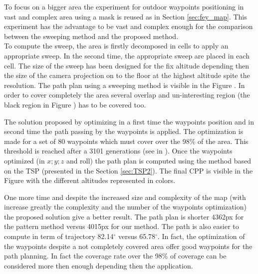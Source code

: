 To focus on a bigger area the experiment for outdoor waypoints positioning in vast and complex area using a mask  is reused as in Section \ref{sec:fey_map}. This experiment has the advantage to be vast and complex enough for the comparison between the sweeping method and the proposed method.\\
To compute the sweep, the area is firstly decomposed in cells to apply an appropriate sweep. In the second time, the appropriate sweep are placed in each cell. The size of the sweep has been designed for the fix altitude depending then the size of the camera projection on to the floor at the highest altitude spite the resolution. 
The path plan using a sweeping method is visible in the Figure . In order to cover completely the area several overlap and un-interesting region (the black region in Figure ) has to be covered too. 

The solution proposed by optimizing in a first time the waypoints position and in second time the path passing by the waypoints is applied. The optimization is made for a set of 80 waypoints which must cover over the 98\% of the area. This threshold is reached after a 3101 generations (see in ). Once the waypoints optimized (in $x;y;z$ and roll) the path plan is computed using the method based on the TSP (presented in the Section \ref{sec:TSP2}). The final CPP is visible in the Figure  with the different altitudes represented in colors.

One more time and despite the increased size and complexity of the map (with increase greatly the complexity and the number of the waypoints optimization) the proposed solution give a better result. The path plan is shorter 4362px for the pattern method versus 4015px for our method. The path is also easier to compute in term of trajectory 82.14$^\circ$ versus 65.78$^\circ$.
In fact, the optimization of the waypoints despite a not completely covered area offer good waypoints for the path planning. In fact the coverage rate over the 98\% of coverage can be considered more then enough depending then the application.
  
